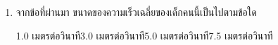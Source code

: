 \begin{enumerate}
	\item  \nonet จากข้อที่ผ่านมา  ขนาดของความเร็วเฉลี่ยของเด็กคนนี้เป็นไปตามข้อใด \runningj
	\begin{2c}
		{1.0  เมตรต่อวินาที}{3.0  เมตรต่อวินาที}{5.0  เมตรต่อวินาที}{7.5  เมตรต่อวินาที}
	\end{2c}
\end{enumerate}
